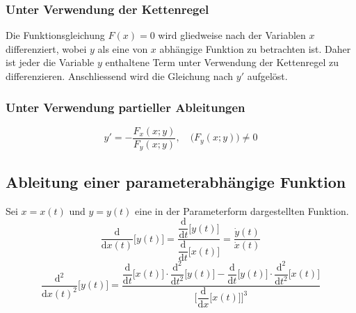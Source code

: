 \subsubsection{Unter Verwendung der Kettenregel}
Die Funktionsgleichung $F\left(x\right)=0$ wird gliedweise nach der Variablen $x$ differenziert, wobei $y$ als eine von $x$ abhängige Funktion zu betrachten ist. Daher ist jeder die Variable $y$ enthaltene Term unter Verwendung der Kettenregel zu differenzieren. Anschliessend wird die Gleichung nach $y'$ aufgelöst.
\subsubsection{Unter Verwendung partieller Ableitungen}
\begin{equation}
\boxed{y'=-\dfrac{F_{x}\left(x;y\right)}{F_y\left(x;y\right)},\quad \Big(F_y\left(x;y\right)\Big)\neq 0}
\end{equation}
\subsection{Ableitung einer parameterabhängige Funktion}
Sei $x=x\left(t\right)$ und $y=y\left(t\right)$ eine in der Parameterform dargestellten Funktion.
\begin{equation}
\boxed{\dfrac{\text{d}}{\text{d}x\left(t\right)}\Big[y\left(t\right)\Big]=\dfrac{\dfrac{\text{d}}{\text{d}t}\Big[y\left(t\right)\Big]}{\dfrac{\text{d}}{\text{d}t}\Big[x\left(t\right)\Big]}=\dfrac{\dot{y}\left(t\right)}{\dot{x}\left(t\right)}}
\end{equation}
\begin{equation}
\boxed{\dfrac{\text{d}^2}{\text{d}x\left(t\right)^2}\Big[y\left(t\right)\Big]=\dfrac{\dfrac{\text{d}}{\text{d}t}\Big[x\left(t\right)\Big]\cdot \dfrac{\text{d}^2}{\text{d}t^2}\Big[y\left(t\right)\Big]-\dfrac{\text{d}}{\text{d}t}\Big[y\left(t\right)\Big]\cdot \dfrac{\text{d}^2}{\text{d}t^2}\Big[x\left(t\right)\Big]}{\Big[\dfrac{\text{d}}{\text{d}x}\Big[x\left(t\right)\Big]\Big]^3}}
\end{equation}
